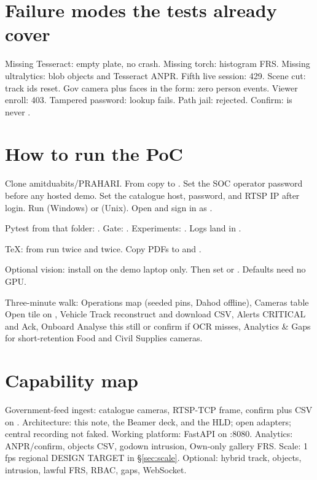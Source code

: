 \documentclass[listings]{csf301-notes}
\begin{document}
\section{Failure modes the tests already cover}
Missing Tesseract: empty plate, no crash. Missing torch: histogram FRS. Missing ultralytics: blob objects and Tesseract ANPR. Fifth live session: 429. Scene cut: track ids reset. Gov camera plus faces in the form: zero person events. Viewer enroll: 403. Tampered password: lookup fails. Path jail:  rejected. Confirm:  is never .

\section{How to run the PoC}
Clone amitduabits/PRAHARI. From  copy  to . Set the SOC operator password before any hosted demo. Set the catalogue host, password, and RTSP IP after login. Run  (Windows) or  (Unix). Open  and sign in as .

Pytest from that folder: . Gate: . Experiments: . Logs land in .

TeX: from  run  twice and  twice. Copy PDFs to  and .

Optional vision: install  on the demo laptop only. Then set  or . Defaults need no GPU.

Three-minute walk: Operations map (seeded pins, Dahod offline), Cameras table Open tile on , Vehicle Track reconstruct  and download CSV, Alerts CRITICAL and Ack, Onboard Analyse this still or confirm if OCR misses, Analytics \& Gaps for short-retention Food and Civil Supplies cameras.

\section{Capability map}
Government-feed ingest: catalogue cameras, RTSP-TCP frame, confirm plus CSV on . Architecture: this note, the Beamer deck, and the HLD; open adapters; central recording not faked. Working platform: FastAPI on :8080. Analytics: ANPR/confirm, objects CSV, godown intrusion, Own-only gallery FRS. Scale: 1\,fps regional DESIGN TARGET in \S\ref{sec:scale}. Optional: hybrid track, objects, intrusion, lawful FRS, RBAC, gaps, WebSocket.
\end{document}
